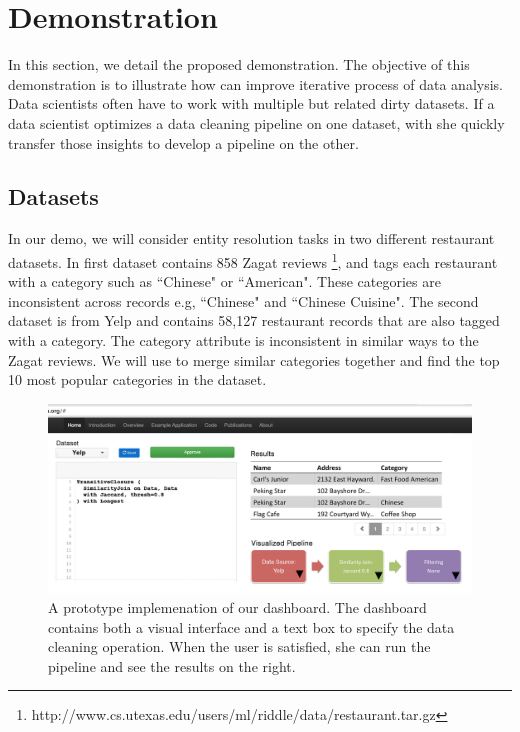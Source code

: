 \section{Demonstration}
In this section, we detail the proposed demonstration.
The objective of this demonstration is to illustrate 
how \sys can improve iterative process of data analysis.
Data scientists often have to work with multiple but related dirty datasets.
If a data scientist optimizes a data cleaning pipeline on one dataset, with \sys 
she quickly transfer those insights to develop a pipeline on the other.

\subsection{Datasets}
In our demo, we will consider entity resolution tasks in two different restaurant datasets.
In first dataset contains 858 Zagat reviews \footnote{http://www.cs.utexas.edu/users/ml/riddle/data/restaurant.tar.gz},
and tags each restaurant with a category such as ``Chinese" or ``American".
These categories are inconsistent across records e.g, ``Chinese" and ``Chinese Cuisine".
The second dataset is from Yelp and contains 58,127 restaurant records that are also tagged with a category.
The category attribute is inconsistent in similar ways to the Zagat reviews.
We will use \sys to merge similar categories together and find the top 10 most popular categories in the dataset.

\begin{figure}[t]
\centering
 \includegraphics[width=\columnwidth]{figs/dashboard_screenshot.png}
 \caption{A prototype implemenation of our \sys dashboard. The dashboard contains both a visual interface and a text box to specify the data cleaning operation. When the user is satisfied, she can run the pipeline and see the results on the right. \label{screenshot}}\vspace{-1.75em}
\end{figure}



